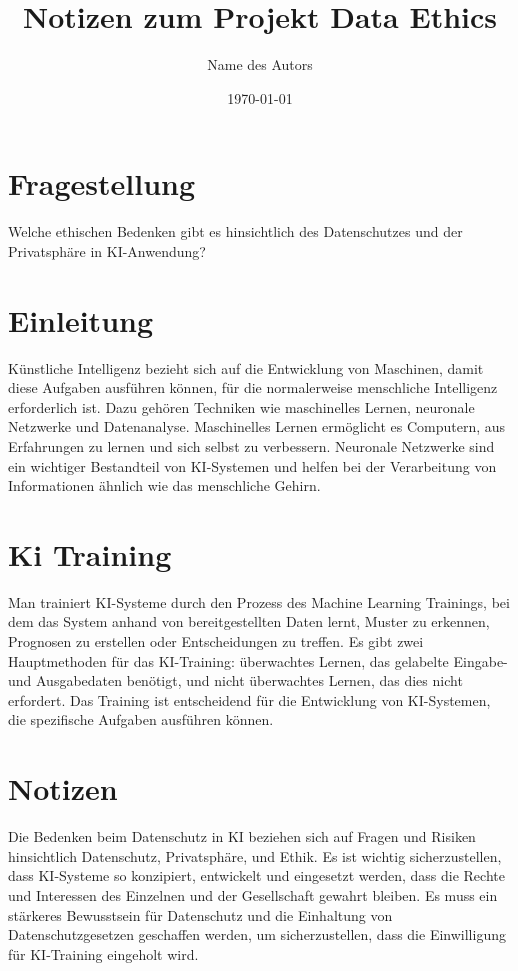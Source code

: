 \documentclass{article}
\title{Notizen zum Projekt Data Ethics}
\author{Name des Autors}
\date{\today}
\begin{document}
\maketitle


\tableofcontents

\section{Fragestellung}
Welche ethischen Bedenken gibt es hinsichtlich des Datenschutzes und der Privatsphäre in KI-Anwendung?

\section{Einleitung}

Künstliche Intelligenz bezieht sich auf die Entwicklung von Maschinen, damit diese Aufgaben ausführen können, für die normalerweise menschliche Intelligenz erforderlich ist. Dazu gehören Techniken wie maschinelles Lernen, neuronale Netzwerke und Datenanalyse. Maschinelles Lernen ermöglicht es Computern, aus Erfahrungen zu lernen und sich selbst zu verbessern. Neuronale Netzwerke sind ein wichtiger Bestandteil von KI-Systemen und helfen bei der Verarbeitung von Informationen ähnlich wie das menschliche Gehirn.

\section{Ki Training}

Man trainiert KI-Systeme durch den Prozess des Machine Learning Trainings, bei dem das System anhand von bereitgestellten Daten lernt, Muster zu erkennen, Prognosen zu erstellen oder Entscheidungen zu treffen. Es gibt zwei Hauptmethoden für das KI-Training: überwachtes Lernen, das gelabelte Eingabe- und Ausgabedaten benötigt, und nicht überwachtes Lernen, das dies nicht erfordert. Das Training ist entscheidend für die Entwicklung von KI-Systemen, die spezifische Aufgaben ausführen können.

\section{Notizen}
 
Die Bedenken beim Datenschutz in KI beziehen sich auf Fragen und Risiken hinsichtlich Datenschutz, Privatsphäre, und Ethik. Es ist wichtig sicherzustellen, dass KI-Systeme so konzipiert, entwickelt und eingesetzt werden, dass die Rechte und Interessen des Einzelnen und der Gesellschaft gewahrt bleiben. Es muss ein stärkeres Bewusstsein für Datenschutz und die Einhaltung von Datenschutzgesetzen geschaffen werden, um sicherzustellen, dass die Einwilligung für KI-Training eingeholt wird.

\printbibliography
\end{document}
